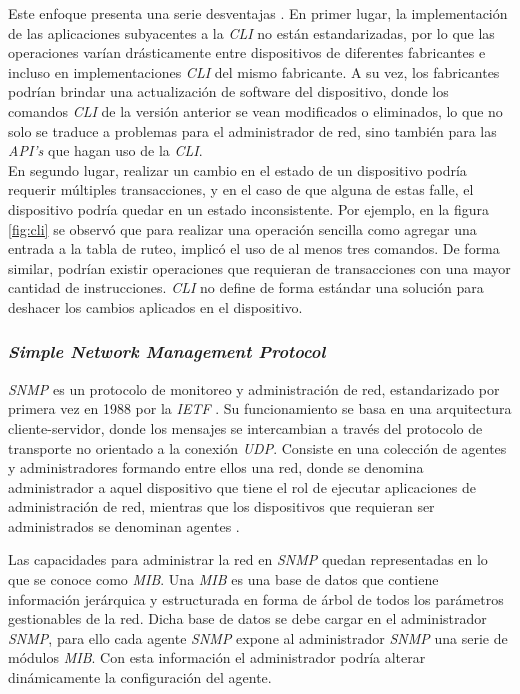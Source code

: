   Este enfoque presenta una serie desventajas \parencite{clilimitacion}. En primer lugar, la implementación de las aplicaciones subyacentes a la \textit{CLI} no están estandarizadas, por lo que las operaciones varían drásticamente entre dispositivos de diferentes fabricantes e incluso en implementaciones \textit{CLI} del mismo fabricante. A su vez, los fabricantes podrían brindar una actualización de software del dispositivo, donde los comandos \textit{CLI} de la versión anterior se vean modificados o eliminados, lo que no solo se traduce a problemas para el administrador de red, sino también para las \textit{API’s} que hagan uso de la \textit{CLI}. 
  \\

  En segundo lugar, realizar un cambio en el estado de un dispositivo podría requerir múltiples transacciones, y en el caso de que alguna de estas falle, el dispositivo podría quedar en un estado inconsistente. Por ejemplo, en la figura \ref{fig:cli} se observó que para realizar una operación sencilla como agregar una entrada a la tabla de ruteo, implicó el uso de al menos tres comandos. De forma similar, podrían existir operaciones que requieran de transacciones con una mayor cantidad de instrucciones. \textit{CLI} no define de forma estándar una solución para deshacer los cambios aplicados en el dispositivo.

  \subsubsection{\textit{Simple Network Management Protocol}}
  \textit{SNMP} es un protocolo de monitoreo y administración de red, estandarizado por primera vez en 1988 por la \textit{IETF} \parencite{snmprfc}. Su funcionamiento se basa en una arquitectura cliente-servidor, donde los mensajes se intercambian a través del protocolo de transporte no orientado a la conexión \textit{UDP}. Consiste en una colección de agentes y administradores formando entre ellos una red, donde se denomina administrador a aquel dispositivo que tiene el rol de ejecutar aplicaciones de administración de red, mientras que los dispositivos que requieran ser administrados se denominan agentes \parencite{snmprfcfunc}.

  Las capacidades para administrar la red en \textit{SNMP} quedan representadas en lo que se conoce como \textit{MIB}. Una \textit{MIB} es una base de datos que contiene información jerárquica y estructurada en forma de árbol de todos los parámetros gestionables de la red. 
  Dicha base de datos se debe cargar en el administrador \textit{SNMP}, para ello cada agente \textit{SNMP} expone al administrador \textit{SNMP} una serie de módulos \textit{MIB}. Con esta información el administrador podría alterar dinámicamente la configuración del agente. 
  \\

